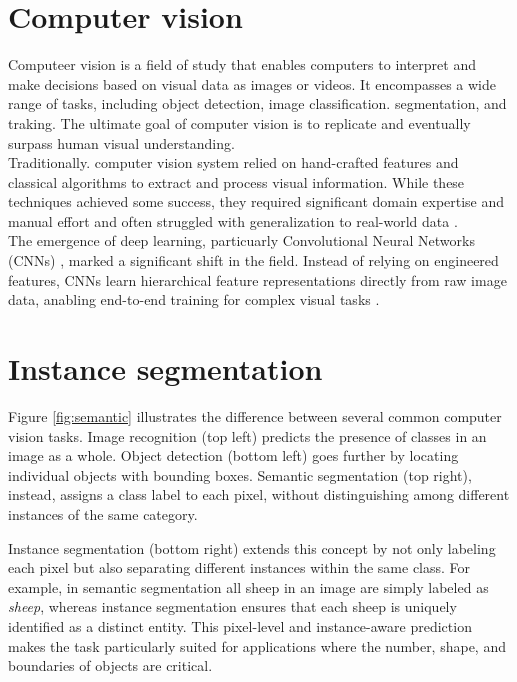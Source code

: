 \documentclass[target=bach,aauheader=,style=]{thud}
\begin{document}
\section{Computer vision}
Computeer vision is a field of study that enables computers to interpret and make decisions based on visual data as images or videos. It encompasses a wide range of tasks, including object detection, image classification. segmentation, and traking. The ultimate goal of computer vision is to replicate and eventually surpass human visual understanding. \\
Traditionally. computer vision system relied on hand-crafted features and classical algorithms to extract and process visual information. While these techniques achieved some success, they required significant domain expertise and manual effort and often struggled with generalization to real-world data \cite{lecun2015deep}.\\
The emergence of deep learning, particuarly Convolutional Neural Networks (CNNs) \cite{lecun1998gradient}, marked a significant shift in the field. Instead of relying on engineered features, CNNs learn hierarchical feature representations directly from raw image data, anabling end-to-end training for complex visual tasks \cite{krizhevsky2012imagenet}.
\section{Instance segmentation}
Figure \ref{fig:semantic} illustrates the difference between several common computer vision tasks. Image recognition (top left) predicts the presence of classes in an image as a whole. Object detection (bottom left) goes further by locating individual objects with bounding boxes. Semantic segmentation (top right), instead, assigns a class label to each pixel, without distinguishing among different instances of the same category. 

Instance segmentation (bottom right) extends this concept by not only labeling each pixel but also separating different instances within the same class. For example, in semantic segmentation all sheep in an image are simply labeled as \textit{sheep}, whereas instance segmentation ensures that each sheep is uniquely identified as a distinct entity. This pixel-level and instance-aware prediction makes the task particularly suited for applications where the number, shape, and boundaries of objects are critical.  
\end{document}
